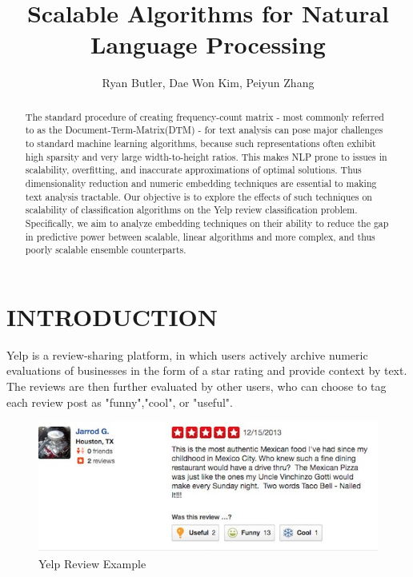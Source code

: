 \documentclass[letterpaper, 12 pt, conference]{ieeeconf}  %
\title{\LARGE \bf
Scalable Algorithms for Natural Language Processing
}
\author{Ryan Butler, Dae Won Kim, Peiyun Zhang}
\begin{document}
\maketitle
\thispagestyle{empty}
\pagestyle{empty}

\begin{abstract}
The standard procedure of creating frequency-count matrix - most commonly referred to as the Document-Term-Matrix(DTM) - for text analysis can pose major challenges to standard machine learning algorithms, because such representations often exhibit high sparsity and very large width-to-height ratios. This makes NLP prone to issues in scalability, overfitting, and inaccurate approximations of optimal solutions. Thus dimensionality reduction and numeric embedding techniques are essential to making text analysis tractable. Our objective is to explore the effects of such techniques on scalability of classification algorithms on the Yelp review classification problem. Specifically, we aim to analyze embedding techniques on their ability to reduce the gap in predictive power between scalable, linear algorithms and more complex, and thus poorly scalable ensemble counterparts.
\end{abstract}


\section{INTRODUCTION}

Yelp is a review-sharing platform, in which users actively archive numeric evaluations of businesses in the form of a star rating and provide context by text. The reviews are then further evaluated by other users, who can choose to tag each review post as "funny","cool", or "useful". 

\begin{figure}[h]
	\centering
	\includegraphics[scale=0.45]{yelp_review.jpg}
	\caption{Yelp Review Example}
    \label{yelp_review}
\end{figure}
\end{document}
